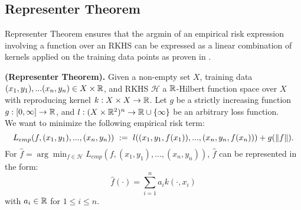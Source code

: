 \documentclass[twoside]{memoir}
\begin{document}
	\subsection{Representer Theorem} \label{subsec:RepThm}
	Representer Theorem ensures that the argmin of an empirical risk expression involving a function over an RKHS can be expressed as a linear combination of kernels applied on the training data points as proven in \cite{Representer_Theorem}.
	\begin{thm} \label{thm:Representer}
		\textbf{(Representer Theorem).}
		Given a non-empty set $X$, training data $(x_1,y_1), ... (x_n,y_n) \in X \times \mathbb{R}$, and RKHS $\mathcal{H}$ a $\mathbb{R}$-Hilbert function space over $X$ with reproducing kernel $k:X \times X \rightarrow \mathbb{R}$. Let $g$ be a strictly increasing function $g:[0, \infty]\rightarrow \mathbb{R}$, and $l:(X \times \mathbb{R}^2)^n \rightarrow \mathbb{R} \cup \{\infty\}$ be an arbitrary loss function. \\
		We want to minimize the following empirical risk term:
		\[ L_{emp}(f, (x_1, y_1), ..., (x_n, y_n)) ~ := ~ l((x_1, y_1, f(x_1)), ..., (x_n, y_n, f(x_n))) + g(\lVert f\rVert) .\]
		For $\hat{f} = \arg \min_{f \in \mathcal{H}} L_{emp}(f, (x_1, y_1), ..., (x_n, y_n))$, $\hat{f}$ can be represented in the form:
		\[ \hat{f}(\cdot) = \sum_{i=1}^{n} a_i k(\cdot, x_i) \]
		with $a_i \in \mathbb{R}$ for $1 \leq i \leq n$.
	\end{thm}
\end{document}
